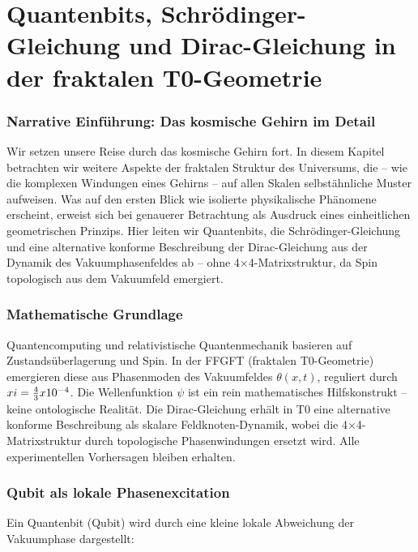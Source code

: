 \chapter{Quantenbits, Schrödinger-Gleichung und Dirac-Gleichung in der fraktalen T0-Geometrie}


	
	\subsection*{Narrative Einführung: Das kosmische Gehirn im Detail}
	
	Wir setzen unsere Reise durch das kosmische Gehirn fort. In diesem Kapitel betrachten wir weitere Aspekte der fraktalen Struktur des Universums, die – wie die komplexen Windungen eines Gehirns – auf allen Skalen selbstähnliche Muster aufweisen. Was auf den ersten Blick wie isolierte physikalische Phänomene erscheint, erweist sich bei genauerer Betrachtung als Ausdruck eines einheitlichen geometrischen Prinzips. Hier leiten wir Quantenbits, die Schrödinger-Gleichung und eine alternative konforme Beschreibung der Dirac-Gleichung aus der Dynamik des Vakuumphasenfeldes ab – ohne 4×4-Matrixstruktur, da Spin topologisch aus dem Vakuumfeld emergiert.
	
	\subsection*{Mathematische Grundlage}
	
	Quantencomputing und relativistische Quantenmechanik basieren auf Zustandsüberlagerung und Spin. In der FFGFT (fraktalen T0-Geometrie) emergieren diese aus Phasenmoden des Vakuumfeldes \(\theta(x,t)\), reguliert durch \(xi = \frac{4}{3} x 10^{-4}\). Die Wellenfunktion \(\psi\) ist ein rein mathematisches Hilfskonstrukt – keine ontologische Realität. Die Dirac-Gleichung erhält in T0 eine alternative konforme Beschreibung als skalare Feldknoten-Dynamik, wobei die 4×4-Matrixstruktur durch topologische Phasenwindungen ersetzt wird. Alle experimentellen Vorhersagen bleiben erhalten.
	
	
	
	\subsection*{Qubit als lokale Phasenexcitation}
	
	Ein Quantenbit (Qubit) wird durch eine kleine lokale Abweichung der Vakuumphase dargestellt:
	
